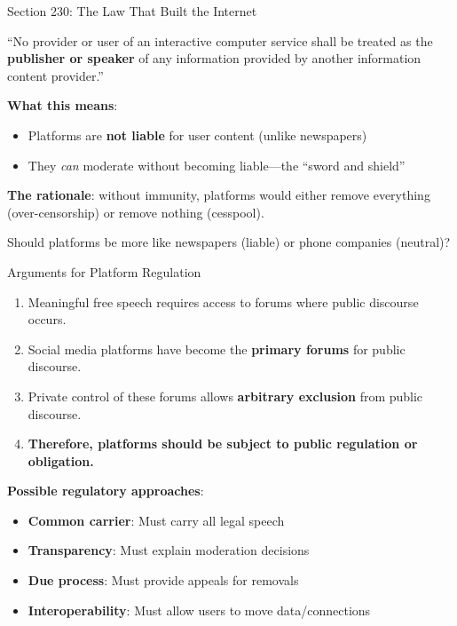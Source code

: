 ﻿\documentclass[aspectratio=169,11pt]{beamer}
\begin{document}
\begin{frame}{Section 230: The Law That Built the Internet}
\begin{casestudybox}
``No provider or user of an interactive computer service shall be treated as the \textbf{publisher or speaker} of any information provided by another information content provider.''
\end{casestudybox}

\vspace{0.2cm}
\textbf{What this means}:
\begin{itemize}
    \item Platforms are \textbf{not liable} for user content (unlike newspapers)
    \item They \textit{can} moderate without becoming liable---the ``sword and shield''
\end{itemize}

\vspace{0.1cm}
\textbf{The rationale}: without immunity, platforms would either remove everything (over-censorship) or remove nothing (cesspool).

\begin{discussionbox}[Discussion]
Should platforms be more like newspapers (liable) or phone companies (neutral)?
\end{discussionbox}
\end{frame}

\begin{frame}{Arguments for Platform Regulation}
\begin{argumentbox}
\begin{enumerate}
    \item Meaningful free speech requires access to forums where public discourse occurs.
    \item Social media platforms have become the \textbf{primary forums} for public discourse.
    \item Private control of these forums allows \textbf{arbitrary exclusion} from public discourse.
    \item[\textbf{C.}] \textbf{Therefore, platforms should be subject to public regulation or obligation.}
\end{enumerate}
\end{argumentbox}

\vspace{0.2cm}
\textbf{Possible regulatory approaches}:
\begin{itemize}
    \item \textbf{Common carrier}: Must carry all legal speech
    \item \textbf{Transparency}: Must explain moderation decisions
    \item \textbf{Due process}: Must provide appeals for removals
    \item \textbf{Interoperability}: Must allow users to move data/connections
\end{itemize}
\end{frame}
\end{document}

